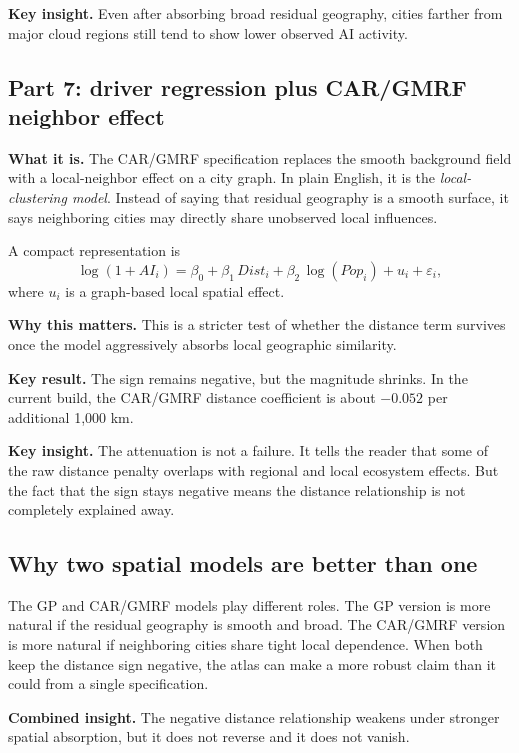 \documentclass[11pt]{article}
\begin{document}
\textbf{Key insight.} Even after absorbing broad residual geography, cities farther from major cloud regions still tend to show lower observed AI activity.

\subsection{Part 7: driver regression plus CAR/GMRF neighbor effect}
\textbf{What it is.} The CAR/GMRF specification replaces the smooth background field with a local-neighbor effect on a city graph. In plain English, it is the \emph{local-clustering model}. Instead of saying that residual geography is a smooth surface, it says neighboring cities may directly share unobserved local influences.

A compact representation is
\[
\log(1 + AI_i) = \beta_0 + \beta_1\,Dist_i + \beta_2\,\log(Pop_i) + u_i + \varepsilon_i,
\]
where $u_i$ is a graph-based local spatial effect.

\textbf{Why this matters.} This is a stricter test of whether the distance term survives once the model aggressively absorbs local geographic similarity.

\textbf{Key result.} The sign remains negative, but the magnitude shrinks. In the current build, the CAR/GMRF distance coefficient is about $-0.052$ per additional 1{,}000 km.

\textbf{Key insight.} The attenuation is not a failure. It tells the reader that some of the raw distance penalty overlaps with regional and local ecosystem effects. But the fact that the sign stays negative means the distance relationship is not completely explained away.

\subsection{Why two spatial models are better than one}
The GP and CAR/GMRF models play different roles. The GP version is more natural if the residual geography is smooth and broad. The CAR/GMRF version is more natural if neighboring cities share tight local dependence. When both keep the distance sign negative, the atlas can make a more robust claim than it could from a single specification.

\textbf{Combined insight.} The negative distance relationship weakens under stronger spatial absorption, but it does not reverse and it does not vanish.
\end{document}
